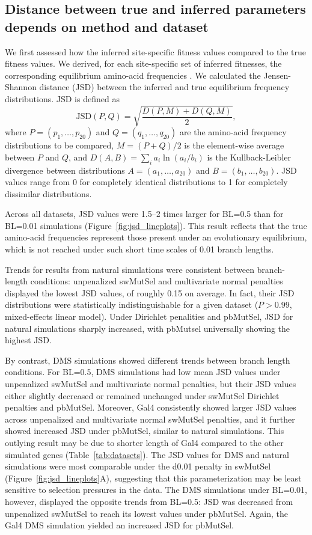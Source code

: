 \documentclass[11pt]{article}
\begin{document}
\subsection*{Distance between true and inferred parameters depends on method and dataset}

We first assessed how the inferred site-specific fitness values compared to the true fitness values. We derived, for each site-specific set of inferred fitnesses, the corresponding equilibrium amino-acid frequencies \citep{SellaHirsh2005,SpielmanWilke2015}. We calculated the Jensen-Shannon distance (JSD) between the inferred and true equilibrium frequency distributions. JSD is defined as
\begin{equation}
\text{JSD}(P,Q) = \sqrt{\frac{D(P,M) + D(Q,M)}{2}},
\end{equation}
where $P=(p_1,\dots,p_{20})$ and $Q=(q_1,\dots,q_{20})$ are the amino-acid frequency distributions to be compared, $M = (P+Q)/2$ is the element-wise average between $P$ and $Q$, and $D(A,B) = \sum_i a_i \ln({a_i}/{b_i})$ is the Kullback-Leibler divergence between distributions $A=(a_1,\dots,a_{20})$ and $B=(b_1,\dots,b_{20})$. JSD values range from 0 for completely identical distributions to 1 for completely dissimilar distributions.

Across all datasets, JSD values were 1.5--2 times larger for BL=0.5 than for BL=0.01 simulations (Figure~\ref{fig:jsd_lineplots}). This result reflects that the true amino-acid frequencies represent those present under an evolutionary equilibrium, which is not reached under such short time scales of 0.01 branch lengths.

Trends for results from natural simulations were consistent between branch-length conditions: unpenalized swMutSel and multivariate normal penalties displayed the lowest JSD values, of roughly 0.15 on average. In fact, their JSD distributions were statistically indistinguishable for a given dataset ($P>0.99$, mixed-effects linear model). Under Dirichlet penalities and pbMutSel, JSD for natural simulations sharply increased, with pbMutsel universally showing the highest JSD.

By contrast, DMS simulations showed different trends between branch length conditions. For BL=0.5, DMS simulations had low mean JSD values under unpenalized swMutSel and multivariate normal penalties, but their JSD values either slightly decreased or remained unchanged under swMutSel Dirichlet penalties and pbMutSel. Moreover, Gal4 consistently showed larger JSD values across unpenalized and multivariate normal swMutSel penalties, and it further showed increased JSD under pbMutSel, similar to natural simulations. This outlying result may be due to shorter length of Gal4 compared to the other simulated genes (Table~\ref{tab:datasets}). The JSD values for DMS and natural simulations were most comparable under the d0.01 penalty in swMutSel (Figure~\ref{fig:jsd_lineplots}A), suggesting that this parameterization may be least sensitive to selection pressures in the data. The DMS simulations under BL=0.01, however, displayed the opposite trends from BL=0.5: JSD was decreased from unpenalized swMutSel to reach its lowest values under pbMutSel. Again, the Gal4 DMS simulation yielded an increased JSD for pbMutSel.
\end{document}
